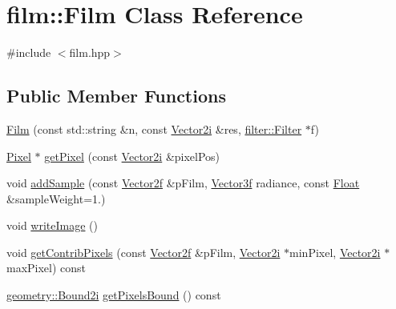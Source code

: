 \hypertarget{classfilm_1_1Film}{}\section{film\+::Film Class Reference}
\label{classfilm_1_1Film}


{\ttfamily \#include $<$film.\+hpp$>$}

\subsection*{Public Member Functions}
\begin{DoxyCompactItemize}
\item 
\mbox{\hyperlink{classfilm_1_1Film_aec1ee55b697f6f9828d4fe761ef2ce9c}{Film}} (const std\+::string \&n, const \mbox{\hyperlink{cyclop_8hpp_ac9c6c66d543f1c0c5bc66579727dae30}{Vector2i}} \&res, \mbox{\hyperlink{classfilter_1_1Filter}{filter\+::\+Filter}} $\ast$f)
\item 
\mbox{\hyperlink{structfilm_1_1Pixel}{Pixel}} $\ast$ \mbox{\hyperlink{classfilm_1_1Film_a8f34b6e92180a01c4117ba79baa319be}{get\+Pixel}} (const \mbox{\hyperlink{cyclop_8hpp_ac9c6c66d543f1c0c5bc66579727dae30}{Vector2i}} \&pixel\+Pos)
\item 
void \mbox{\hyperlink{classfilm_1_1Film_aac2f3224d0e20d1b5ebe92583354644a}{add\+Sample}} (const \mbox{\hyperlink{cyclop_8hpp_a0c5eff6545fe0b71d0592c88d930b697}{Vector2f}} \&p\+Film, \mbox{\hyperlink{cyclop_8hpp_a5a0a2e85b081623ef3f7e7e8d43024f5}{Vector3f}} radiance, const \mbox{\hyperlink{cyclop_8hpp_a07afd7094cb489cbd514c76e6f55d34f}{Float}} \&sample\+Weight=1.)
\item 
void \mbox{\hyperlink{classfilm_1_1Film_a61527d407e6a30cfad0e61bd250c61ce}{write\+Image}} ()
\item 
void \mbox{\hyperlink{classfilm_1_1Film_a9d9e52c6fa8912d0e448dd64ffeba7de}{get\+Contrib\+Pixels}} (const \mbox{\hyperlink{cyclop_8hpp_a0c5eff6545fe0b71d0592c88d930b697}{Vector2f}} \&p\+Film, \mbox{\hyperlink{cyclop_8hpp_ac9c6c66d543f1c0c5bc66579727dae30}{Vector2i}} $\ast$min\+Pixel, \mbox{\hyperlink{cyclop_8hpp_ac9c6c66d543f1c0c5bc66579727dae30}{Vector2i}} $\ast$max\+Pixel) const
\item 
\mbox{\hyperlink{namespacegeometry_a918a919c0a947983a121b11e5c64934f}{geometry\+::\+Bound2i}} \mbox{\hyperlink{classfilm_1_1Film_a2d97cfb2b1014f47fc9ba81f8daa46d4}{get\+Pixels\+Bound}} () const
\end{DoxyCompactItemize}
